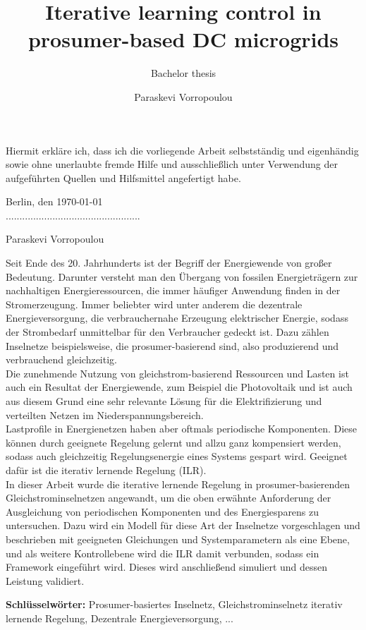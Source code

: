 \documentclass[a4paper,12pt,twoside]{kth-mag}
\title{Iterative learning control in prosumer-based DC microgrids}
\subtitle{Bachelor thesis}
\author{Paraskevi Vorropoulou}
\begin{document}
\frontmatter
\pagestyle{plain}


\clearpage

\begin{declarationoforiginality}

Hiermit erkläre ich, dass ich die vorliegende Arbeit selbstst\"andig und eigenh\"andig sowie
ohne unerlaubte fremde Hilfe und ausschließlich unter Verwendung der aufgef\"uhrten Quellen
und Hilfsmittel angefertigt habe.

\vspace{20mm}

Berlin, den \today \\

\vspace{10mm}
.................................................

\vspace{2mm}
Paraskevi Vorropoulou
\newpage
\end{declarationoforiginality}

\begin{zusammenfassung}
Seit Ende des 20. Jahrhunderts ist der Begriff der Energiewende von großer Bedeutung. Darunter versteht man den Übergang von fossilen Energieträgern zur nachhaltigen Energieressourcen, die immer häufiger Anwendung finden in der Stromerzeugung. Immer beliebter wird unter anderem die dezentrale Energieversorgung, die verbrauchernahe Erzeugung elektrischer Energie, sodass der Strombedarf unmittelbar für den Verbraucher gedeckt ist. Dazu zählen Inselnetze beispielsweise, die prosumer-basierend sind, also produzierend und verbrauchend gleichzeitig. 
\\Die zunehmende Nutzung von gleichstrom-basierend Ressourcen und Lasten ist auch ein Resultat der Energiewende, zum Beispiel die Photovoltaik und ist auch aus diesem Grund eine sehr relevante Lösung für die Elektrifizierung und verteilten Netzen im Niederspannungsbereich. 
\\Lastprofile in Energienetzen haben aber oftmals periodische Komponenten. Diese können durch geeignete Regelung gelernt und allzu ganz kompensiert werden, sodass auch gleichzeitig Regelungsenergie eines Systems gespart wird.  
Geeignet dafür ist die iterativ lernende Regelung (ILR). 
\\In dieser Arbeit wurde die iterative lernende Regelung 
in prosumer-basierenden Gleichstrominselnetzen angewandt, um die oben erwähnte Anforderung der Ausgleichung von periodischen Komponenten und des Energiesparens zu untersuchen. Dazu wird ein Modell für diese Art der Inselnetze vorgeschlagen und beschrieben mit geeigneten Gleichungen und Systemparametern als eine Ebene, und als weitere Kontrollebene wird die ILR damit verbunden, sodass ein Framework eingeführt wird. Dieses wird anschließend simuliert und dessen Leistung validiert. 
 
{\textbf{Schl\"usselw\"orter:} Prosumer-basiertes Inselnetz, Gleichstrominselnetz iterativ lernende Regelung, Dezentrale Energieversorgung, ...}

\end{zusammenfassung}
\end{document}
